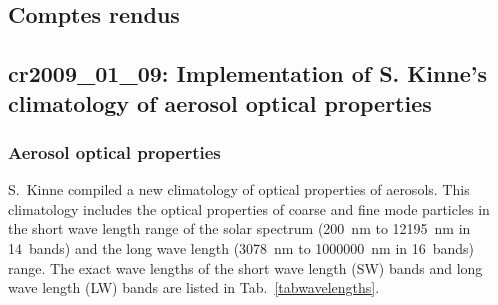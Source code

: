 \begin{appendix}

\chapter{Comptes rendus}

\section[cr2009\_01\_09: Kinne aerosol optical properties]{cr2009\_01\_09: Implementation of S. Kinne's climatology of aerosol optical
  properties}\label{cr20090109}

\subsection{Aerosol optical properties}

S.~Kinne compiled a new climatology of optical properties of
aerosols. This climatology includes the optical properties 
of coarse and fine mode
particles in the short wave length range of the solar spectrum (200~nm
to 12195~nm in 14~bands) and the long wave length (3078~nm to
1000000~nm in 16~bands)
range. The exact wave lengths of the short wave length (SW) bands and
long wave length (LW) bands
are listed in Tab.~\ref{tabwavelengths}.


\end{appendix}
